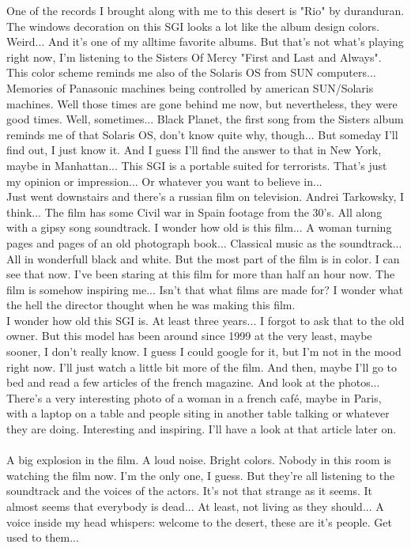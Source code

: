 \documentclass[11pt,twoside,a4paper]{book}
\begin{document}
\begin{multicols*}{2}
One of the records I brought along with me to this desert is "Rio" by duranduran. The windows decoration on this SGI looks a lot like the album design colors. Weird... And it's one of my alltime favorite albums. But that's not what's playing right now, I'm listening to the Sisters Of Mercy "First and Last and Always". This color scheme reminds me also of the Solaris OS from SUN computers... Memories of Panasonic machines being controlled by american SUN/Solaris machines. Well those times are gone behind me now, but nevertheless, they were good times. Well, sometimes... Black Planet, the first song from the Sisters album reminds me of that Solaris OS, don't know quite why, though... But someday I'll find out, I just know it. And I guess I'll find the answer to that in New York, maybe in Manhattan... This SGI is a portable suited for terrorists. That's just my opinion or impression... Or whatever you want to believe in... ~\\

Just went downstairs and there's a russian film on television. Andrei Tarkowsky, I think... The film has some Civil war in Spain footage from the 30's. All along with a gipsy song soundtrack. I wonder how old is this film... A woman turning pages and pages of an old photograph book... Classical music as the soundtrack... All in wonderfull black and white. But the most part of the film is in color. I can see that now. I've been staring at this film for more than half an hour now. The film is somehow inspiring me... Isn't that what films are made for? I wonder what the hell the director thought when he was making this film. ~\\

I wonder how old this SGI is. At least three years... I forgot to ask that to the old owner. But this model has been around since 1999 at the very least, maybe sooner, I don't really know. I guess I could google for it, but I'm not in the mood right now. I'll just watch a little bit more of the film. And then, maybe I'll go to bed and read a few articles of the french magazine. And look at the photos... There's a very interesting photo of a woman in a french caf{\'e}, maybe in Paris, with a laptop on a table and people siting in another table talking or whatever they are doing. Interesting and inspiring. I'll have a look at that article later on. ~\\

A big explosion in the film. A loud noise. Bright colors. Nobody in this room is watching the film now. I'm the only one, I guess. But they're all listening to the soundtrack and the voices of the actors. It's not that strange as it seems. It almost seems that everybody is dead... At least, not living as they should... A voice inside my head whispers: welcome to the desert, these are it's people. Get used to them... ~\\


\end{multicols*}
\end{document}
